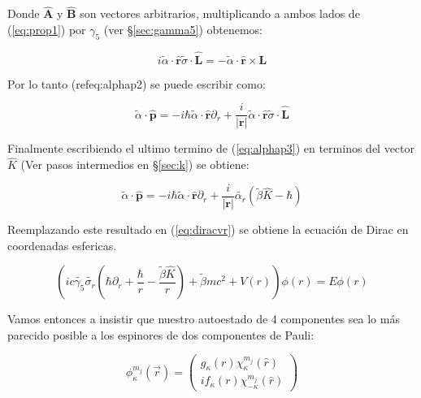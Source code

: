 \documentclass[a4paper, 12pt]{article} %
\begin{document}
Donde $\hat{\mathbf{A}}$ y $\hat{\mathbf{B}}$ son vectores arbitrarios, 
multiplicando a ambos lados de (\ref{eq:prop1}) por $\gamma_5$ (ver \S \ref{sec:gamma5}) 
obtenemos:   

\begin{equation}
i\widetilde{\alpha}\cdot\hat{\mathbf{r}}\widetilde{\sigma} \cdot \hat{\mathbf{L}} = -\widetilde{\alpha}\cdot \hat{\mathbf{r}} \times \mathbf{L}
\end{equation}

Por lo tanto (ref{eq:alphap2}) se puede escribir como:

\begin{equation}\label{eq:alphap3}
\widetilde{\alpha}\cdot \mathbf{\hat{p}} = -i\hbar \widetilde{\alpha}\cdot \hat{\mathbf{r}}\partial_r + \dfrac{i}{|\mathbf{r}|}
\widetilde{\alpha}\cdot \hat{\mathbf{r}}\widetilde{\sigma}\cdot \hat{\mathbf{L}}
\end{equation} 

Finalmente escribiendo el ultimo termino de (\ref{eq:alphap3}) en terminos
del vector $\hat{K}$ (Ver pasos intermedios en \S \ref{sec:k}) se obtiene:

\begin{equation}\label{alphap4}
\widetilde{\alpha} \cdot \mathbf{\hat{p}} = -i\hbar \widetilde{\alpha}\cdot \hat{\mathbf{r}}\partial_r + \dfrac{i}{|\mathbf{r}|} \widetilde{\alpha_r}(\widetilde{\beta}\hat{K}-\hbar)
\end{equation}

Reemplazando este resultado en (\ref{eq:diracvr}) se obtiene la ecuaci\'on de Dirac en coordenadas esfericas.

\begin{equation}\label{eq:radialdirac}
\left (ic\widetilde{\gamma_5}\widetilde{\sigma_r} \left (\hbar \partial_r + \dfrac{\hbar}{r} -  \dfrac{\widetilde{\beta}\hat{K}}{r}\right )  + \widetilde{\beta} m c^2 + V(r) \right ) \phi(r) = E \phi (r)
\end{equation}

Vamos entonces a insistir que nuestro autoestado de 4 componentes sea lo m\'as parecido posible a los espinores de dos componentes de Pauli:

\begin{equation}\label{eq:funciondeonda}
\phi^{m_j}_{\kappa} (\vec{r} ) = \left( \substack{g_{\kappa}(r)\chi^{m_j}_\kappa (\hat{r}) \\ if_\kappa(r)\chi^{m_j}_{-\kappa} (\hat{r}) } \right) 
\end{equation}
\end{document}
